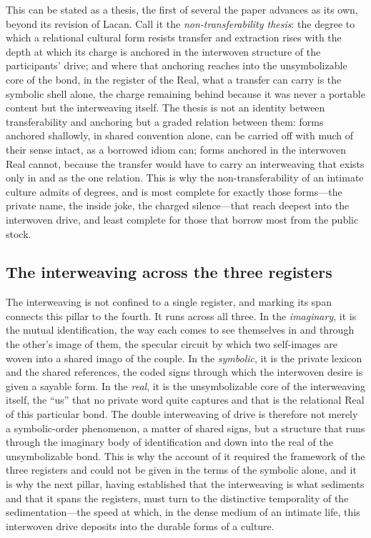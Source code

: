 This can be stated as a thesis, the first of several the paper advances as its own, beyond its revision of Lacan. Call it the \emph{non-transferability thesis}: the degree to which a relational cultural form resists transfer and extraction rises with the depth at which its charge is anchored in the interwoven structure of the participants' drive; and where that anchoring reaches into the unsymbolizable core of the bond, in the register of the Real, what a transfer can carry is the symbolic shell alone, the charge remaining behind because it was never a portable content but the interweaving itself. The thesis is not an identity between transferability and anchoring but a graded relation between them: forms anchored shallowly, in shared convention alone, can be carried off with much of their sense intact, as a borrowed idiom can; forms anchored in the interwoven Real cannot, because the transfer would have to carry an interweaving that exists only in and as the one relation. This is why the non-transferability of an intimate culture admits of degrees, and is most complete for exactly those forms---the private name, the inside joke, the charged silence---that reach deepest into the interwoven drive, and least complete for those that borrow most from the public stock.

\subsection*{The interweaving across the three registers}

The interweaving is not confined to a single register, and marking its span connects this pillar to the fourth. It runs across all three. In the \emph{imaginary}, it is the mutual identification, the way each comes to see themselves in and through the other's image of them, the specular circuit by which two self-images are woven into a shared imago of the couple. In the \emph{symbolic}, it is the private lexicon and the shared references, the coded signs through which the interwoven desire is given a sayable form. In the \emph{real}, it is the unsymbolizable core of the interweaving itself, the ``us'' that no private word quite captures and that is the relational Real of this particular bond. The double interweaving of drive is therefore not merely a symbolic-order phenomenon, a matter of shared signs, but a structure that runs through the imaginary body of identification and down into the real of the unsymbolizable bond. This is why the account of it required the framework of the three registers and could not be given in the terms of the symbolic alone, and it is why the next pillar, having established that the interweaving is what sediments and that it spans the registers, must turn to the distinctive temporality of the sedimentation---the speed at which, in the dense medium of an intimate life, this interwoven drive deposits into the durable forms of a culture.
